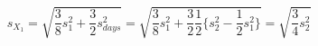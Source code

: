 

\[
s_{X_{1}} = \sqrt{\frac{3}{8}s_{1}^{2} + \frac{3}{2}s_{days}^{2}} = \sqrt{\frac{3}{8}s_{1}^{2} + \frac{3}{2}\frac{1}{2}\{s_{2}^{2} - \frac{1}{2}s_{1}^{2}\}} = \sqrt{\frac{3}{4}s_{2}^{2}}
\]



